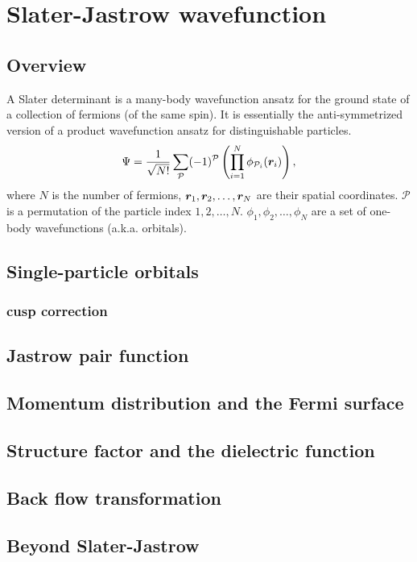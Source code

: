 \chapter{Slater-Jastrow wavefunction}
\section{Overview}

A Slater determinant is a many-body wavefunction ansatz for the ground state of a collection of fermions (of the same spin). It is essentially the anti-symmetrized version of a product wavefunction ansatz for distinguishable particles.
\begin{align}
\Psi = \frac{1}{\sqrt{N!}}\sum\limits_{\mathcal{P}} (-1)^{\mathcal{P}} \left( \prod\limits_{i=1}^N \phi_{\mathcal{P}_i}(\boldsymbol{r}_i) \right),\label{eq:det}
\end{align}
where $N$ is the number of fermions, $\boldsymbol{r}_1, \boldsymbol{r}_2, \dots, \boldsymbol{r}_N$ are their spatial coordinates. $\mathcal{P}$ is a permutation of the particle index $1, 2, \dots, N$. $\phi_1, \phi_2, \dots, \phi_N$ are a set of one-body wavefunctions (a.k.a. orbitals).

\section{Single-particle orbitals}
\subsection{cusp correction}
\section{Jastrow pair function}






\section{Momentum distribution and the Fermi surface}
\section{Structure factor and the dielectric function}
\section{Back flow transformation}
\section{Beyond Slater-Jastrow}